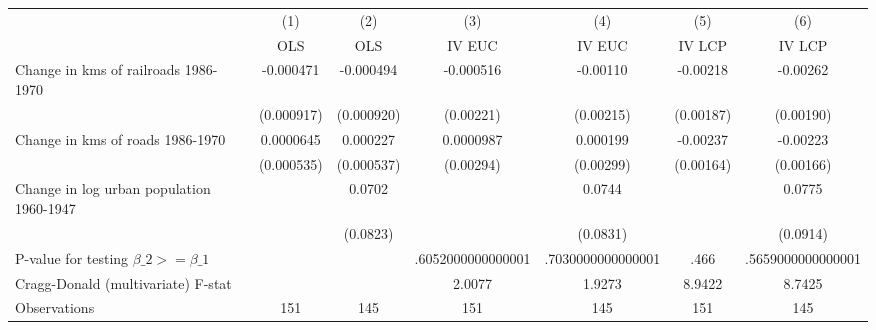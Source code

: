 {
\def\sym#1{\ifmmode^{#1}\else\(^{#1}\)\fi}
\begin{tabular}{l*{6}{c}}
\hline\hline
                &\multicolumn{1}{c}{(1)}&\multicolumn{1}{c}{(2)}&\multicolumn{1}{c}{(3)}&\multicolumn{1}{c}{(4)}&\multicolumn{1}{c}{(5)}&\multicolumn{1}{c}{(6)}\\
                &\multicolumn{1}{c}{OLS}&\multicolumn{1}{c}{OLS}&\multicolumn{1}{c}{IV EUC}&\multicolumn{1}{c}{IV EUC}&\multicolumn{1}{c}{IV LCP}&\multicolumn{1}{c}{IV LCP}\\
\hline
Change in kms of railroads 1986-1970&-0.000471         &-0.000494         &-0.000516         & -0.00110         & -0.00218         & -0.00262         \\
                &(0.000917)         &(0.000920)         &(0.00221)         &(0.00215)         &(0.00187)         &(0.00190)         \\
[1em]
Change in kms of roads 1986-1970&0.0000645         & 0.000227         &0.0000987         & 0.000199         & -0.00237         & -0.00223         \\
                &(0.000535)         &(0.000537)         &(0.00294)         &(0.00299)         &(0.00164)         &(0.00166)         \\
[1em]
Change in log urban population 1960-1947&                  &   0.0702         &                  &   0.0744         &                  &   0.0775         \\
                &                  & (0.0823)         &                  & (0.0831)         &                  & (0.0914)         \\
\hline
P-value for testing $\beta\_{2} >= \beta\_{1}$&                  &                  &.6052000000000001         &.7030000000000001         &     .466         &.5659000000000001         \\
Cragg-Donald (multivariate) F-stat&                  &                  &   2.0077         &   1.9273         &   8.9422         &   8.7425         \\
Observations    &      151         &      145         &      151         &      145         &      151         &      145         \\
\hline\hline
\end{tabular}
}
